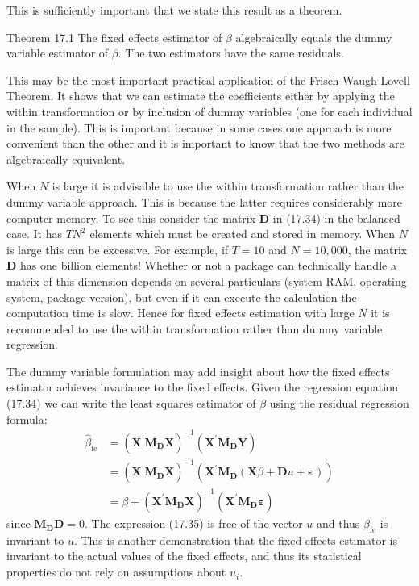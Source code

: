 \documentclass[10pt]{article}
\begin{document}
This is sufficiently important that we state this result as a theorem.

Theorem 17.1 The fixed effects estimator of $\beta$ algebraically equals the dummy variable estimator of $\beta$. The two estimators have the same residuals.

This may be the most important practical application of the Frisch-Waugh-Lovell Theorem. It shows that we can estimate the coefficients either by applying the within transformation or by inclusion of dummy variables (one for each individual in the sample). This is important because in some cases one approach is more convenient than the other and it is important to know that the two methods are algebraically equivalent.

When $N$ is large it is advisable to use the within transformation rather than the dummy variable approach. This is because the latter requires considerably more computer memory. To see this consider the matrix $\boldsymbol{D}$ in (17.34) in the balanced case. It has $T N^{2}$ elements which must be created and stored in memory. When $N$ is large this can be excessive. For example, if $T=10$ and $N=10,000$, the matrix $\boldsymbol{D}$ has one billion elements! Whether or not a package can technically handle a matrix of this dimension depends on several particulars (system RAM, operating system, package version), but even if it can execute the calculation the computation time is slow. Hence for fixed effects estimation with large $N$ it is recommended to use the within transformation rather than dummy variable regression.

The dummy variable formulation may add insight about how the fixed effects estimator achieves invariance to the fixed effects. Given the regression equation (17.34) we can write the least squares estimator of $\beta$ using the residual regression formula:
$$
\begin{aligned}
\widehat{\beta}_{\mathrm{fe}} &=\left(\boldsymbol{X}^{\prime} \boldsymbol{M}_{\boldsymbol{D}} \boldsymbol{X}\right)^{-1}\left(\boldsymbol{X}^{\prime} \boldsymbol{M}_{\boldsymbol{D}} \boldsymbol{Y}\right) \\
&=\left(\boldsymbol{X}^{\prime} \boldsymbol{M}_{\boldsymbol{D}} \boldsymbol{X}\right)^{-1}\left(\boldsymbol{X}^{\prime} \boldsymbol{M}_{\boldsymbol{D}}(\boldsymbol{X} \beta+\boldsymbol{D} u+\boldsymbol{\varepsilon})\right) \\
&=\beta+\left(\boldsymbol{X}^{\prime} \boldsymbol{M}_{\boldsymbol{D}} \boldsymbol{X}\right)^{-1}\left(\boldsymbol{X}^{\prime} \boldsymbol{M}_{\boldsymbol{D}} \boldsymbol{\varepsilon}\right)
\end{aligned}
$$
since $\boldsymbol{M}_{\boldsymbol{D}} \boldsymbol{D}=0$. The expression (17.35) is free of the vector $u$ and thus $\widehat{\beta}_{\mathrm{fe}}$ is invariant to $u$. This is another demonstration that the fixed effects estimator is invariant to the actual values of the fixed effects, and thus its statistical properties do not rely on assumptions about $u_{i}$.
\end{document}
